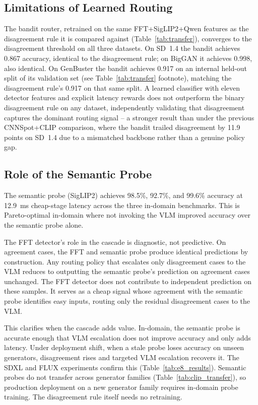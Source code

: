 \documentclass{ieeeaccess}
\begin{document}
\subsection{Limitations of Learned Routing}
The bandit router, retrained on the same FFT+SigLIP2+Qwen features as the disagreement
rule it is compared against (Table~\ref{tab:transfer}), converges to the disagreement
threshold on all three datasets. On SD~1.4 the bandit achieves 0.867 accuracy, identical
to the disagreement rule; on BigGAN it achieves 0.998, also identical. On GenBuster the
bandit achieves 0.917 on an internal held-out split of its validation set (see
Table~\ref{tab:transfer} footnote), matching the disagreement rule's 0.917 on that same
split. A learned classifier with eleven detector features and explicit latency rewards
does not outperform the binary disagreement rule on any dataset, independently
validating that disagreement captures the dominant routing signal -- a stronger result
than under the previous CNNSpot+CLIP comparison, where the bandit trailed disagreement
by 11.9 points on SD~1.4 due to a mismatched backbone rather than a genuine policy gap.



\subsection{Role of the Semantic Probe}

The semantic probe (SigLIP2) achieves 98.5\%, 92.7\%, and 99.6\% accuracy at
12.9~ms cheap-stage latency across the three in-domain benchmarks. This is
Pareto-optimal in-domain where not invoking the VLM improved accuracy over the
semantic probe alone.

The FFT detector's role in the cascade is diagnostic, not predictive. On agreement
cases, the FFT and semantic probe produce identical predictions by construction. Any
routing policy that escalates only disagreement cases to the VLM reduces to outputting
the semantic probe's prediction on agreement cases unchanged. The FFT detector
 does not contribute to independent prediction on these samples. It serves as a cheap signal
whose agreement with the semantic probe identifies easy inputs, routing only the
residual disagreement cases to the VLM.

This clarifies when the cascade adds value. In-domain, the semantic probe is accurate
enough that VLM escalation does not improve accuracy and only adds latency. Under
deployment shift, when a stale probe loses accuracy on unseen generators, disagreement
rises and targeted VLM escalation recovers it. The SDXL and FLUX experiments confirm
this (Table~\ref{tab:e8_results}). Semantic probes do not transfer across generator
families (Table~\ref{tab:clip_transfer}), so production deployment on a new generator
family requires in-domain probe training. The disagreement rule itself needs no
retraining.
\end{document}
